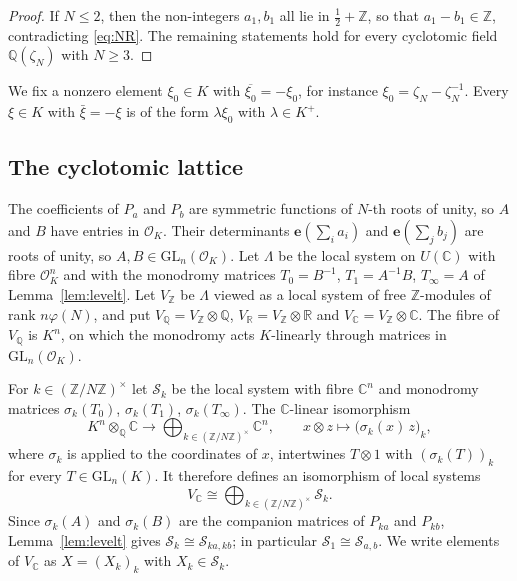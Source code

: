 \documentclass[11pt]{amsart}
\theoremstyle{definition}
\theoremstyle{remark}
\numberwithin{equation}{section}
\newcommand{\Q}{\mathbb{Q}}
\newcommand{\Z}{\mathbb{Z}}
\newcommand{\C}{\mathbb{C}}
\newcommand{\R}{\mathbb{R}}
\newcommand{\e}{\mathbf{e}}
\newcommand{\cS}{\mathcal{S}}
\newcommand{\cO}{\mathcal{O}}
\newcommand{\Sab}{\cS_{a,b}}
\begin{document}
\begin{proof}
If $N\le2$, then the non-integers $a_1,b_1$ all lie in $\frac12+\Z$, so that $a_1-b_1\in\Z$, contradicting \eqref{eq:NR}. The remaining statements hold for every cyclotomic field $\Q(\zeta_N)$ with $N\ge3$.
\end{proof}

We fix a nonzero element $\xi_0\in K$ with $\overline{\xi_0}=-\xi_0$, for instance $\xi_0=\zeta_N-\zeta_N^{-1}$. Every $\xi\in K$ with $\bar\xi=-\xi$ is of the form $\lambda\xi_0$ with $\lambda\in K^+$.

\subsection{The cyclotomic lattice}\label{subsec:lattice}
The coefficients of $P_a$ and $P_b$ are symmetric functions of $N$-th roots of unity, so $A$ and $B$ have entries in $\cO_K$. Their determinants $\e(\sum_i a_i)$ and $\e(\sum_j b_j)$ are roots of unity, so $A,B\in\mathrm{GL}_n(\cO_K)$. Let $\Lambda$ be the local system on $U(\C)$ with fibre $\cO_K^n$ and with the monodromy matrices $T_0=B^{-1}$, $T_1=A^{-1}B$, $T_\infty=A$ of Lemma~\ref{lem:levelt}. Let $V_\Z$ be $\Lambda$ viewed as a local system of free $\Z$-modules of rank $n\varphi(N)$, and put $V_\Q=V_\Z\otimes\Q$, $V_\R=V_\Z\otimes\R$ and $V_\C=V_\Z\otimes\C$. The fibre of $V_\Q$ is $K^n$, on which the monodromy acts $K$-linearly through matrices in $\mathrm{GL}_n(\cO_K)$.

For $k\in(\Z/N\Z)^\times$ let $\cS_k$ be the local system with fibre $\C^n$ and monodromy matrices $\sigma_k(T_0)$, $\sigma_k(T_1)$, $\sigma_k(T_\infty)$. The $\C$-linear isomorphism
\begin{equation}\label{eq:splitmap}
K^n\otimes_\Q\C\longrightarrow\bigoplus_{k\in(\Z/N\Z)^\times}\C^n,\qquad x\otimes z\longmapsto\big(\sigma_k(x)\,z\big)_k ,
\end{equation}
where $\sigma_k$ is applied to the coordinates of $x$, intertwines $T\otimes1$ with $(\sigma_k(T))_k$ for every $T\in\mathrm{GL}_n(K)$. It therefore defines an isomorphism of local systems
\begin{equation}\label{eq:split}
V_\C\cong\bigoplus_{k\in(\Z/N\Z)^\times}\cS_k .
\end{equation}
Since $\sigma_k(A)$ and $\sigma_k(B)$ are the companion matrices of $P_{ka}$ and $P_{kb}$, Lemma~\ref{lem:levelt} gives $\cS_k\cong\cS_{ka,kb}$; in particular $\cS_1\cong\Sab$. We write elements of $V_\C$ as $X=(X_k)_k$ with $X_k\in\cS_k$.
\end{document}

